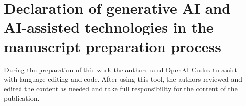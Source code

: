 \section*{Declaration of generative AI and AI-assisted technologies in the manuscript preparation process}
During the preparation of this work the authors used OpenAI Codex to assist with language editing and code. After using this tool, the authors reviewed and edited the content as needed and take full responsibility for the content of the publication.
